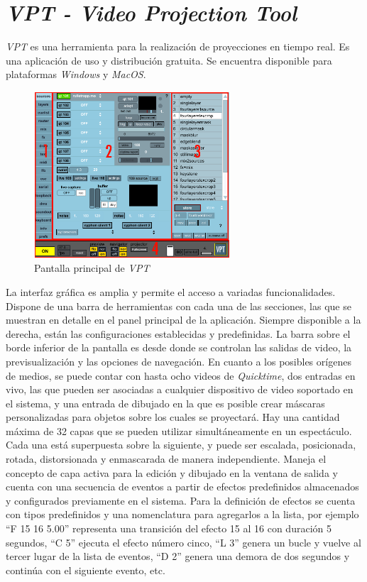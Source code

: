 \section{\emph{VPT - Video Projection Tool}}
\emph{VPT} \cite{VPT} es una herramienta para la realización de proyecciones en tiempo real. Es una aplicación de uso y distribución gratuita. Se encuentra disponible para plataformas \emph{Windows} y \emph{MacOS}.

\begin{figure}[H]
  \centering
    \includegraphics[width=0.65\textwidth]{./Cap3_aplicaciones/apps-vpt.png}
  \caption{Pantalla principal de \emph{VPT}}%
  \label{fig:Apps-VPT}
\end{figure}

La interfaz gráfica es amplia y permite el acceso a variadas funcionalidades. Dispone de una barra de herramientas con cada una de las secciones, las que se muestran en detalle en el panel principal de la aplicación. Siempre disponible a la derecha, están las configuraciones establecidas y predefinidas. La barra sobre el borde inferior de la pantalla es desde donde se controlan las salidas de video, la previsualización y las opciones de navegación.
En cuanto a los posibles orígenes de medios, se puede contar con hasta ocho videos de \emph{Quicktime}, dos entradas en vivo, las que pueden ser asociadas a cualquier dispositivo de video soportado en el sistema, y una entrada de dibujado en la que es posible crear máscaras personalizadas para objetos sobre los cuales se proyectará.
Hay una cantidad máxima de 32 capas que se pueden utilizar simultáneamente en un espectáculo. Cada una está superpuesta sobre la siguiente, y puede ser escalada, posicionada, rotada, distorsionada y enmascarada de manera independiente. Maneja el concepto de capa activa para la edición y dibujado en la ventana de salida y cuenta con una secuencia de eventos a partir de efectos predefinidos almacenados y configurados previamente en el sistema. Para la definición de efectos se cuenta con tipos predefinidos y una nomenclatura para agregarlos a la lista, por ejemplo ``F 15 16 5.00'' representa una transición del efecto 15 al 16 con duración 5 segundos, ``C 5'' ejecuta el efecto número cinco, ``L 3'' genera un bucle y vuelve al tercer lugar de la lista de eventos, ``D 2'' genera una demora de dos segundos y continúa con el siguiente evento, etc.

